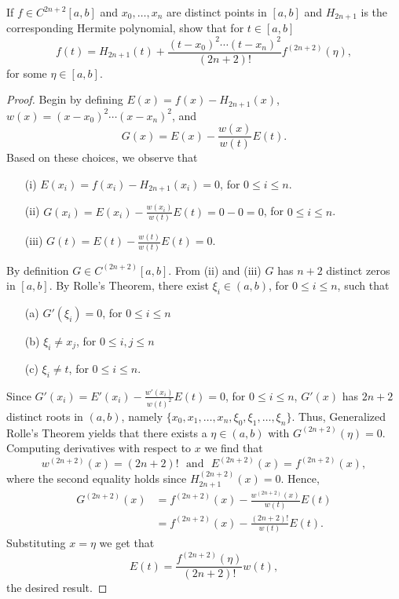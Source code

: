 \documentclass[8pt]{article}
\theoremstyle{definition}
\newenvironment{exercise}[1]
  {\renewcommand\theinnerexercise{#1}\innerexercise}
  {\endinnerexercise}
\begin{document}
\begin{exercise}{4}
If $f \in C^{2n + 2} [a, b]$ and $x_0, \ldots, x_n$ are distinct points in $[a, b]$ and $H_{2n + 1}$ is the corresponding Hermite polynomial, show that for $t \in [a, b]$ $$f(t) = H_{2n + 1} (t) + \frac{(t - x_0)^2 \cdots (t - x_n)^2}{(2n + 2)!} f^{(2n + 2)} (\eta),$$ for some $\eta \in [a, b]$.
\end{exercise}

\begin{proof}
Begin by defining $E(x) = f(x) - H_{2n + 1} (x)$, $w(x) = (x - x_0)^2 \cdots (x - x_n)^2$, and $$G(x) = E(x) - \frac{w (x)}{w (t)} E(t).$$ Based on these choices, we observe that 
\begin{enumerate}
	\item [(i)] $E (x_i) = f(x_i) - H_{2n + 1} (x_i) = 0$, for $0 \leq i \leq n$.
	\item [(ii)] $G(x_i) = E(x_i) - \frac{w (x_i)}{w (t)} E(t) = 0 - 0 = 0$, for $0 \leq i \leq n$.
	\item [(iii)] $G(t) = E(t) - \frac{w (t)}{w (t)} E(t) = 0$.
\end{enumerate}
By definition $G \in C^{(2n + 2)} [a, b]$. From (ii) and (iii) $G$ has $n + 2$ distinct zeros in $[a, b]$. By Rolle's Theorem, there exist $\xi_i \in (a, b)$, for $0 \leq i \leq n$, such that 
\begin{enumerate}
	\item [(a)] $G'(\xi_i) = 0$, for $0 \leq i \leq n$
	\item [(b)] $\xi_i \neq x_j$, for $0 \leq i, j \leq n$
	\item [(c)] $\xi_i \neq t$, for $0 \leq i \leq n$.
\end{enumerate}
Since $G'(x_i) = E'(x_i) - \frac{w'(x_i)}{w(t)^2} E(t) = 0$, for $0 \leq i \leq n$, $G'(x)$ has $2n + 2$ distinct roots in $(a, b)$, namely $\{x_0, x_1, \ldots, x_n, \xi_0, \xi_1, \ldots, \xi_n \}$. Thus, Generalized Rolle's Theorem yields that there exists a $\eta \in (a,b)$ with $G^{(2n + 2)} (\eta) = 0$. Computing derivatives with respect to $x$ we find that $$w^{(2n + 2)} (x) = (2n + 2)! \ \ \ \text{and} \ \ \ E^{(2n + 2)} (x) = f^{(2n + 2)} (x),$$ where the second equality holds since $H_{2n + 1}^{(2n + 2)} (x) = 0$. Hence,
\begin{align*}
G^{(2n + 2)} (x) &= f^{(2n + 2)} (x) - \frac{w^{(2n + 2)} (x)}{w(t)} E(t) \\
&= f^{(2n + 2)} (x) - \frac{(2n + 2)!}{w(t)} E(t).
\end{align*}
Substituting $x = \eta$ we get that $$E(t) = \frac{f^{(2n + 2)} (\eta)}{(2n + 2)!} w(t),$$ the desired result.
\end{proof}
\end{document}
